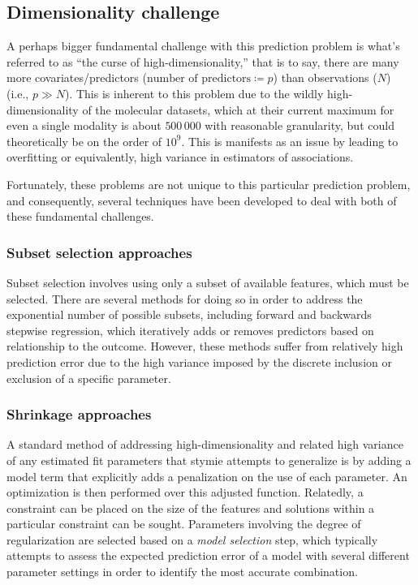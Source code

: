 \subsection{Dimensionality challenge}
A perhaps bigger fundamental challenge with this prediction problem is what’s referred to as “the curse of high-dimensionality,” that is to say, there are many more covariates/predictors ($\text{number of predictors} \coloneqq p $) than observations ($N$) (i.e., $p \gg N$).  This is inherent to this problem due to the wildly high-dimensionality of the molecular datasets, which at their current maximum for even a single modality is about $500\,000$ with reasonable granularity, but could theoretically be on the order of $10^9$. This is manifests as an issue by leading to overfitting or equivalently, high variance in estimators of associations.

Fortunately, these problems are not unique to this particular prediction problem, and consequently, several techniques have been developed to deal with both of these fundamental challenges. 

\subsubsection{Subset selection approaches}

Subset selection involves using only a subset of available features, which must be selected. There are several methods for doing so in order to address the exponential number of possible subsets, including forward and backwards stepwise regression, which iteratively adds or removes predictors based on relationship to the outcome. However, these methods suffer from relatively high prediction error due to the high variance imposed by the discrete inclusion or exclusion of a specific parameter\cite{friedman_elements_2001}.

\subsubsection{Shrinkage approaches}

A standard method of addressing high-dimensionality and related high variance of any estimated fit parameters that stymie attempts to generalize is by adding a model term that explicitly adds a penalization on the use of each parameter. An optimization is then performed over this adjusted function. Relatedly, a constraint can be placed on the size of the features and solutions within a particular constraint can be sought. Parameters involving the degree of regularization are selected based on a \textit{model selection} step, which typically attempts to assess the expected prediction error of a model with several different parameter settings in order to identify the most accurate combination. 

